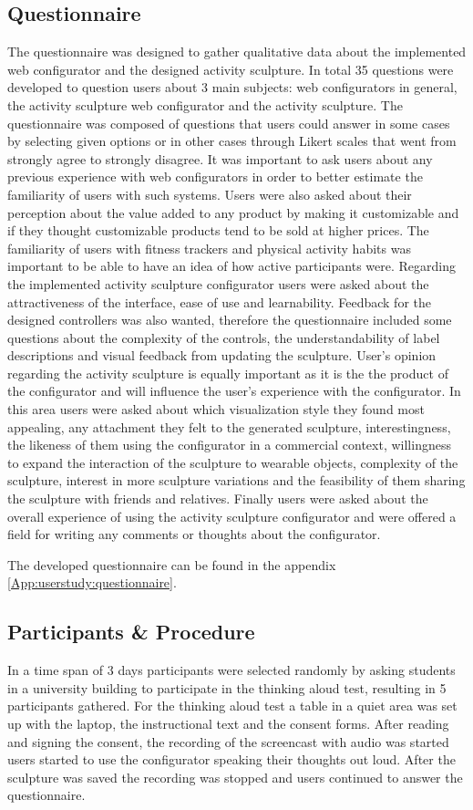 \documentclass[../medieninformatik-arbeit.tex]{subfiles}
\begin{document}
\subsection{Questionnaire}
The questionnaire was designed to gather qualitative data about the implemented web configurator and the designed activity sculpture. In total 35 questions were developed to question users about 3 main subjects: web configurators in general, the activity sculpture web configurator and the activity sculpture. The questionnaire was composed of questions that users could answer in some cases by selecting given options or in other cases through Likert scales that went from strongly agree to strongly disagree. It was important to ask users about any previous experience with web configurators in order to better estimate the familiarity of users with such systems. Users were also asked about their perception about the value added to any product by making it customizable and if they thought customizable products tend to be sold at higher prices. The familiarity of users with fitness trackers and physical activity habits was important to be able to have an idea of how active participants were. Regarding the implemented activity sculpture configurator users were asked about the attractiveness of the interface, ease of use and learnability. Feedback for the designed controllers was also wanted, therefore the questionnaire included some questions about the complexity of the controls, the understandability of label descriptions and visual feedback from updating the sculpture. User's opinion regarding the activity sculpture is equally important as it is the the product of the configurator and will influence the user's experience with the configurator. In this area users were asked about which visualization style they found most appealing, any attachment they felt to the generated sculpture, interestingness, the likeness of them using the configurator in a commercial context, willingness to expand the interaction of the sculpture to wearable objects, complexity of the sculpture, interest in more sculpture variations  and the feasibility of them sharing the sculpture with friends and relatives.
Finally users were asked about the overall experience of using the activity sculpture configurator and were offered a field for writing any comments or thoughts about the configurator. 

The developed questionnaire can be found in the appendix \ref{App:userstudy:questionnaire}.

\subsection{Participants \& Procedure}
In a time span of 3 days participants were selected randomly by asking students in a university building to participate in the thinking aloud test, resulting in 5 participants gathered. For the thinking aloud test a table in a quiet area was set up with the laptop, the instructional text and the consent forms. After reading and signing the consent, the recording of the screencast with audio was started  users started to use the configurator speaking their thoughts out loud. After the sculpture was saved the recording was stopped and users continued to answer the questionnaire. 
\end{document}
